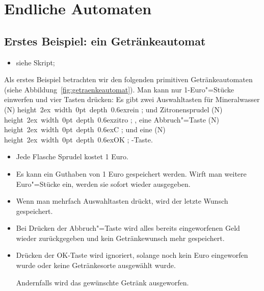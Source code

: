 \Tut\chapter{Endliche Automaten}
\label{k:endl-auto}

\Tut\section{Erstes Beispiel: ein Getr\"ankeautomat}
\def\mybox#1{\hbox{\vrule height 2ex width 0pt depth 0.6ex#1}}
\def\taste[#1]#2{%
  \tikz[x=8mm,y=8mm,baseline=(N.base)] \tasteinnerx[#1]{#2};%
}
\def\tasteinnerx[#1]#2{%
  \node[midway,inner sep=0mm,draw,rounded corners,anchor=base,minimum width=10mm,#1] (N) {\mybox{#2}}%
}
\def\tasteinner[#1]#2{%
  node[midway,inner sep=0mm,draw,rounded corners,minimum width=10mm,#1] (N) {\mybox{#2}}%
}
\def\tasteinnerOK{\tasteinner[fill=green!20]{OK}}
\def\tasteOK{\taste[fill=green!20]{OK}}
\def\tasteC{\taste[fill=red!20]{C}}
\def\tasteinnerC{\tasteinner[fill=red!20]{C}}
\def\tasteRein{\taste[fill=blue!10]{rein}}
\def\tasteinnerRein{\tasteinner[fill=blue!10]{rein}}
\def\tasteZitro{\taste[fill=yellow!10]{zitro}}
\def\tasteinnerZitro{\tasteinner[fill=yellow!10]{zitro}}

\begin{extract}[tut]
  \begin{itemize}
  \item siehe Skript;
  \end{itemize}
\end{extract}

Als erstes Beispiel betrachten wir den folgenden primitiven
Getränkeautomaten (siehe Abbildung~\ref{fig:getraenkeautomat}).  Man
kann nur 1-Euro"=Stücke einwerfen und vier Tasten drücken: Es gibt
zwei Auswahltasten für Mineralwasser \tasteRein{} und Zitronensprudel
\tasteZitro{}, eine Abbruch"=Taste \tasteC{} und eine \tasteOK-Taste.

\begin{itemize}
\item Jede Flasche Sprudel kostet 1 Euro.
\item Es kann ein Guthaben von 1 Euro gespeichert werden. Wirft man
  weitere Euro"=Stücke ein, werden sie sofort wieder ausgegeben.
\item Wenn man mehrfach Auswahltasten drückt, wird der letzte Wunsch
  gespeichert.
\item Bei Drücken der Abbruch"=Taste wird alles bereits eingeworfenen
  Geld wieder zurückgegeben und kein Getränkewunsch mehr gespeichert.
\item Drücken der OK-Taste wird ignoriert, solange noch kein Euro
  eingeworfen wurde oder keine Getränkesorte ausgewählt wurde.

  Andernfalls wird das gewünschte Getränk ausgeworfen.
\end{itemize}

